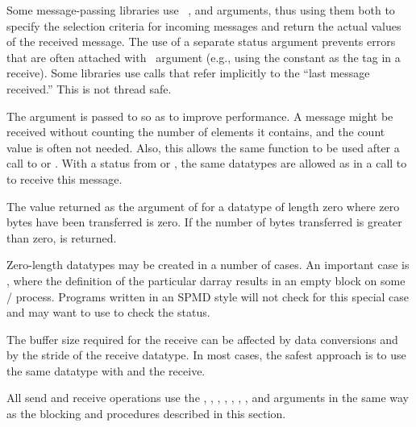 \begin{rationale}
Some message-passing libraries use \INOUT\ ,
 and  arguments, thus using them both to specify
the selection criteria for incoming messages and return the actual 
values of the received message.
The use of a separate status argument prevents errors that are often attached
with \INOUT\ argument (e.g., using the
 constant as
the tag in a receive).
Some libraries use calls that refer implicitly to the ``last message
received.''  This is not thread safe.

The  argument is passed to  so as to
improve performance. A message might be received without counting the number
of elements it contains, and the count value is often not needed.
Also, this allows the same function to be used after a call to
 or . With a status from  or ,
the same datatypes are allowed as in a call to  to receive this message.
\end{rationale}

The value returned as the  argument of
 for a datatype of length zero where zero bytes
have been transferred is zero.  If the number of bytes transferred is
greater than zero,  is returned.

\begin{rationale}
Zero-length datatypes may be created in a number of cases.
An important case is
, where the
definition of the particular
darray
results in an empty block on some
\MPI/ process.  Programs written in an SPMD style will not check for
this special case and may want to use  to check
the status.
\end{rationale}

\begin{users}
The buffer size required for the receive can be affected by data conversions and
by the stride of the receive datatype.
In most cases, the safest approach is to use the same datatype with  and the receive.
\end{users}

All send and receive operations use the , ,
, , , ,
, and  arguments in the same way as the blocking
 and
 procedures described in this section.


